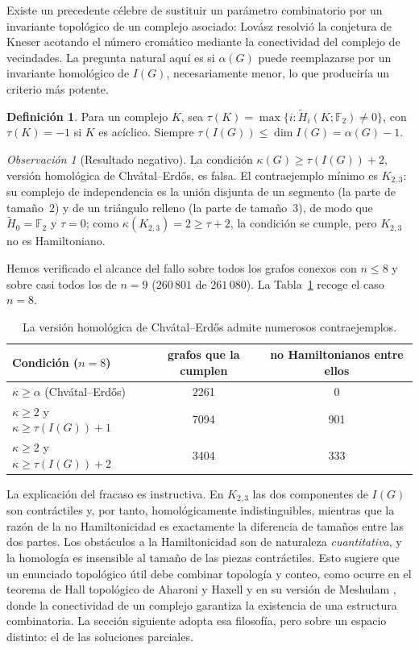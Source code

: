 \documentclass[11pt,a4paper]{article}
\theoremstyle{definition}
\newtheorem{definicion}[teorema]{Definición}
\theoremstyle{remark}
\newtheorem{observacion}[teorema]{Observación}
\begin{document}
Existe un precedente célebre de sustituir un parámetro combinatorio por un invariante topológico de un complejo asociado: Lovász \cite{lovasz} resolvió la conjetura de Kneser acotando el número cromático mediante la conectividad del complejo de vecindades. La pregunta natural aquí es si $\alpha(G)$ puede reemplazarse por un invariante homológico de $I(G)$, necesariamente menor, lo que produciría un criterio más potente.

\begin{definicion}
Para un complejo $K$, sea $\tau(K)=\max\{i:\widetilde H_i(K;\mathbb{F}_2)\neq0\}$, con $\tau(K)=-1$ si $K$ es acíclico. Siempre $\tau(I(G))\le\dim I(G)=\alpha(G)-1$.
\end{definicion}

\begin{observacion}[Resultado negativo]\label{obs:homologia}
La condición $\kappa(G)\ge\tau(I(G))+2$, versión homológica de Chvátal--Erdős, es falsa. El contraejemplo mínimo es $K_{2,3}$: su complejo de independencia es la unión disjunta de un segmento (la parte de tamaño~$2$) y de un triángulo relleno (la parte de tamaño~$3$), de modo que $\widetilde H_0=\mathbb{F}_2$ y $\tau=0$; como $\kappa(K_{2,3})=2\ge\tau+2$, la condición se cumple, pero $K_{2,3}$ no es Hamiltoniano.
\end{observacion}

Hemos verificado el alcance del fallo sobre todos los grafos conexos con $n\le8$ y sobre casi todos los de $n=9$ ($260\,801$ de $261\,080$). La Tabla~\ref{tab:hom} recoge el caso $n=8$.

\begin{table}[h]
\centering
\begin{tabular}{lcc}
\toprule
Condición ($n=8$) & grafos que la cumplen & no Hamiltonianos entre ellos\\
\midrule
$\kappa\ge\alpha$ (Chvátal--Erdős) & 2261 & 0\\
$\kappa\ge2$ y $\kappa\ge\tau(I(G))+1$ & 7094 & 901\\
$\kappa\ge2$ y $\kappa\ge\tau(I(G))+2$ & 3404 & 333\\
\bottomrule
\end{tabular}
\caption{La versión homológica de Chvátal--Erdős admite numerosos contraejemplos.}\label{tab:hom}
\end{table}

La explicación del fracaso es instructiva. En $K_{2,3}$ las dos componentes de $I(G)$ son contráctiles y, por tanto, homológicamente indistinguibles, mientras que la razón de la no Hamiltonicidad es exactamente la diferencia de tamaños entre las dos partes. Los obstáculos a la Hamiltonicidad son de naturaleza \emph{cuantitativa}, y la homología es insensible al tamaño de las piezas contráctiles. Esto sugiere que un enunciado topológico útil debe combinar topología y conteo, como ocurre en el teorema de Hall topológico de Aharoni y Haxell \cite{aharoni} y en su versión de Meshulam \cite{meshulam}, donde la conectividad de un complejo garantiza la existencia de una estructura combinatoria. La sección siguiente adopta esa filosofía, pero sobre un espacio distinto: el de las soluciones parciales.
\end{document}
